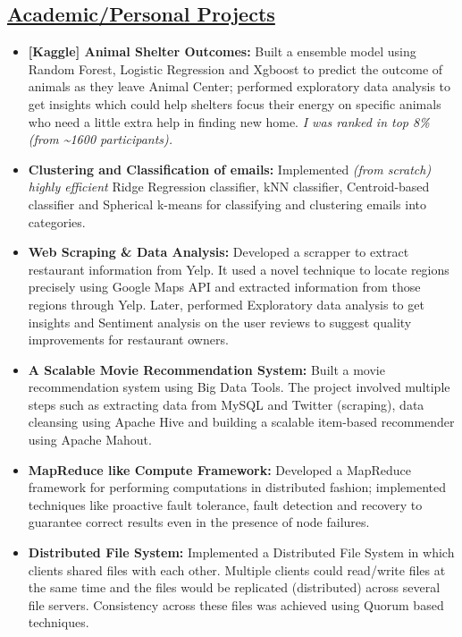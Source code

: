 \documentclass[10pt]{article}
\begin{document}
\subsection*{\underline{Academic/Personal Projects}}
\vspace{-0.05cm}
\begin{itemize}[leftmargin=0.15in]
\item {\bfseries [Kaggle] Animal Shelter Outcomes:} Built a ensemble model using Random Forest, Logistic Regression and Xgboost to predict the outcome of animals as they leave Animal Center; performed exploratory data analysis to get insights which could help shelters focus their energy on specific animals who need a little extra help in finding new home. \textit{I was ranked in top 8\% (from \~{}1600 participants).}

\item {\bfseries Clustering and Classification of emails:} Implemented  \textit{(from scratch) highly efficient} Ridge Regression classifier, kNN classifier, Centroid-based classifier and Spherical k-means for classifying and clustering emails into categories.

\item {\bfseries Web Scraping \& Data Analysis:} Developed a scrapper to extract restaurant information from Yelp. It used a novel technique to locate regions precisely using Google Maps API and extracted information from those regions through Yelp. Later, performed Exploratory data analysis to get insights and Sentiment analysis on the user reviews to suggest quality improvements for restaurant owners.

\item {\bfseries A Scalable Movie Recommendation System:} Built a movie recommendation system using Big Data Tools. The project involved multiple steps such as extracting data from MySQL and Twitter (scraping), data cleansing using Apache Hive and building a scalable item-based recommender using Apache Mahout.

\item {\bfseries MapReduce like Compute Framework:} Developed a MapReduce framework for performing computations in distributed fashion; implemented techniques like proactive fault tolerance, fault detection and recovery to guarantee correct results even in the presence of node failures.

\item {\bfseries Distributed File System:} Implemented a Distributed File System in which clients shared files with each other. Multiple clients could read/write files at the same time and the files would be replicated (distributed) across several file servers. Consistency across these files was achieved using Quorum based techniques.

\end{itemize}
\end{document}

